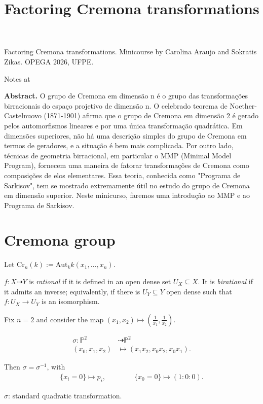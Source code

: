 


\title{Factoring Cremona transformations}
\noindent
Factoring Cremona transformations.
Minicourse by Carolina Araujo and
Sokratis Zikas.
OPEGA 2026, UFPE.

\medskip\noindent
Notes at


\medskip\noindent
\textbf{Abstract.}
O grupo de Cremona em dimensão n é o grupo
das transformações birracionais do espaço
projetivo de dimensão n. O celebrado teorema
de Noether-Castelnuovo (1871-1901) afirma que
o grupo de Cremona em dimensão 2 é gerado
pelos automorfismos lineares e por uma única
transformação quadrática. Em dimensões
superiores, não há uma descrição
simples do
grupo de Cremona em termos de geradores, e a
situação é bem mais complicada. Por outro
lado, técnicas de geometria birracional, em
particular o MMP (Minimal Model Program),
fornecem uma maneira de fatorar
transformações de Cremona como
composições de
elos elementares. Essa teoria, conhecida como
"Programa de Sarkisov", tem se mostrado
extremamente útil no estudo do grupo de
Cremona em dimensão superior. Neste
minicurso, faremos uma introdução ao
MMP e ao
Programa de Sarkisov.

\tableofcontents

\section{Cremona group}
\label{section-cremona-group}

\noindent
Let $\text{Cr}_n(k):=\text{Aut}_k
k(x_1,…,x_n)$.

\begin{definition}
\label{definition-rational-map}
$f:X \dashrightarrow Y$ is {\it rational}
if it is defined in an open dense set $U_X
\subseteq X$.
It is {\it birational} if it admits an
inverse;
equivalently, if there is $U_Y \subseteq Y$
open dense
such that $f:U_X \to U_Y$ is an isomorphism.
\end{definition}

\noindent
Fix $n =2$ and consider the map
$(x_1,x_2) \mapsto
\left(\frac{1}{x_1},\frac{1}{x_2}\right)$.

\begin{example}
\label{example-stand-quadr-trans}
$$
\begin{aligned}
\sigma: \mathbb{P}^2 &\dashrightarrow
\mathbb{P}^2\\
(x_0,x_1,x_2) &\longmapsto
(x_1x_2,x_0x_2,x_0x_1).
\end{aligned}
$$

\noindent
Then $\sigma=\sigma^{-1}$, with
$$
\begin{aligned}
\{x_i=0\}\mapsto p_i,\qquad \qquad
\{x_0=0\}\mapsto (1:0:0).
\end{aligned}
$$

\noindent
$\sigma$: standard quadratic transformation.
\end{example}

